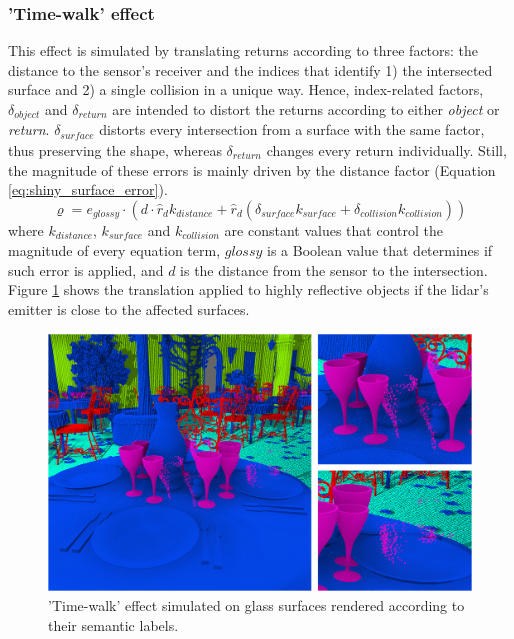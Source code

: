 \subsubsection{'Time-walk' effect}

This effect is simulated by translating returns according to three factors: the distance to the sensor's receiver and the indices that identify 1) the intersected surface and 2) a single collision in a unique way. Hence, index-related factors, $\delta_{\textit{object}}$ and $\delta_{\textit{return}}$ are intended to distort the returns according to either \textit{object} or \textit{return}. $\delta_{\textit{surface}}$ distorts every intersection from a surface with the same factor, thus preserving the shape, whereas $\delta_{\textit{return}}$ changes every return individually. Still, the magnitude of these errors is mainly driven by the distance factor (Equation \ref{eq:shiny_surface_error}).
\begin{equation}
    \label{eq:shiny_surface_error}
    \varrho = e_{\textit{glossy}} \cdot (d \cdot \hat{r}_{d} k_{\textit{distance}} + \hat{r}_{d}(\delta_{\textit{surface}}k_{\textit{surface}} + \delta_{\textit{collision}}k_{\textit{collision}})) 
\end{equation}
where $k_{\textit{distance}}$, $k_{\textit{surface}}$ and $k_{\textit{collision}}$ are constant values that control the magnitude of every equation term, $\textit{glossy}$ is a Boolean value that determines if such error is applied, and $d$ is the distance from the sensor to the intersection. Figure \ref{fig:shiny_surface_error} shows the translation applied to highly reflective objects if the \acrshort{lidar}'s emitter is close to the affected surfaces.

\begin{figure}[ht]
	\centering
	\includegraphics[width=\linewidth]{figs/lidar_simulation/glossy_time_walk.png}
	\caption{'Time-walk' effect simulated on glass surfaces rendered according to their semantic labels. }
	\label{fig:shiny_surface_error}
\end{figure}

